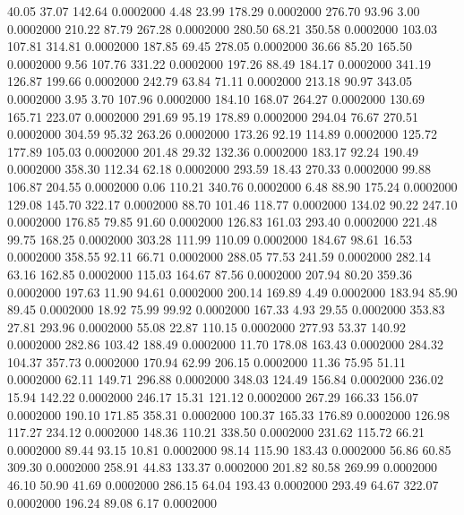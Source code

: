  40.05   37.07  142.64   0.0002000
   4.48   23.99  178.29   0.0002000
 276.70   93.96    3.00   0.0002000
 210.22   87.79  267.28   0.0002000
 280.50   68.21  350.58   0.0002000
 103.03  107.81  314.81   0.0002000
 187.85   69.45  278.05   0.0002000
  36.66   85.20  165.50   0.0002000
   9.56  107.76  331.22   0.0002000
 197.26   88.49  184.17   0.0002000
 341.19  126.87  199.66   0.0002000
 242.79   63.84   71.11   0.0002000
 213.18   90.97  343.05   0.0002000
   3.95    3.70  107.96   0.0002000
 184.10  168.07  264.27   0.0002000
 130.69  165.71  223.07   0.0002000
 291.69   95.19  178.89   0.0002000
 294.04   76.67  270.51   0.0002000
 304.59   95.32  263.26   0.0002000
 173.26   92.19  114.89   0.0002000
 125.72  177.89  105.03   0.0002000
 201.48   29.32  132.36   0.0002000
 183.17   92.24  190.49   0.0002000
 358.30  112.34   62.18   0.0002000
 293.59   18.43  270.33   0.0002000
  99.88  106.87  204.55   0.0002000
   0.06  110.21  340.76   0.0002000
   6.48   88.90  175.24   0.0002000
 129.08  145.70  322.17   0.0002000
  88.70  101.46  118.77   0.0002000
 134.02   90.22  247.10   0.0002000
 176.85   79.85   91.60   0.0002000
 126.83  161.03  293.40   0.0002000
 221.48   99.75  168.25   0.0002000
 303.28  111.99  110.09   0.0002000
 184.67   98.61   16.53   0.0002000
 358.55   92.11   66.71   0.0002000
 288.05   77.53  241.59   0.0002000
 282.14   63.16  162.85   0.0002000
 115.03  164.67   87.56   0.0002000
 207.94   80.20  359.36   0.0002000
 197.63   11.90   94.61   0.0002000
 200.14  169.89    4.49   0.0002000
 183.94   85.90   89.45   0.0002000
  18.92   75.99   99.92   0.0002000
 167.33    4.93   29.55   0.0002000
 353.83   27.81  293.96   0.0002000
  55.08   22.87  110.15   0.0002000
 277.93   53.37  140.92   0.0002000
 282.86  103.42  188.49   0.0002000
  11.70  178.08  163.43   0.0002000
 284.32  104.37  357.73   0.0002000
 170.94   62.99  206.15   0.0002000
  11.36   75.95   51.11   0.0002000
  62.11  149.71  296.88   0.0002000
 348.03  124.49  156.84   0.0002000
 236.02   15.94  142.22   0.0002000
 246.17   15.31  121.12   0.0002000
 267.29  166.33  156.07   0.0002000
 190.10  171.85  358.31   0.0002000
 100.37  165.33  176.89   0.0002000
 126.98  117.27  234.12   0.0002000
 148.36  110.21  338.50   0.0002000
 231.62  115.72   66.21   0.0002000
  89.44   93.15   10.81   0.0002000
  98.14  115.90  183.43   0.0002000
  56.86   60.85  309.30   0.0002000
 258.91   44.83  133.37   0.0002000
 201.82   80.58  269.99   0.0002000
  46.10   50.90   41.69   0.0002000
 286.15   64.04  193.43   0.0002000
 293.49   64.67  322.07   0.0002000
 196.24   89.08    6.17   0.0002000
